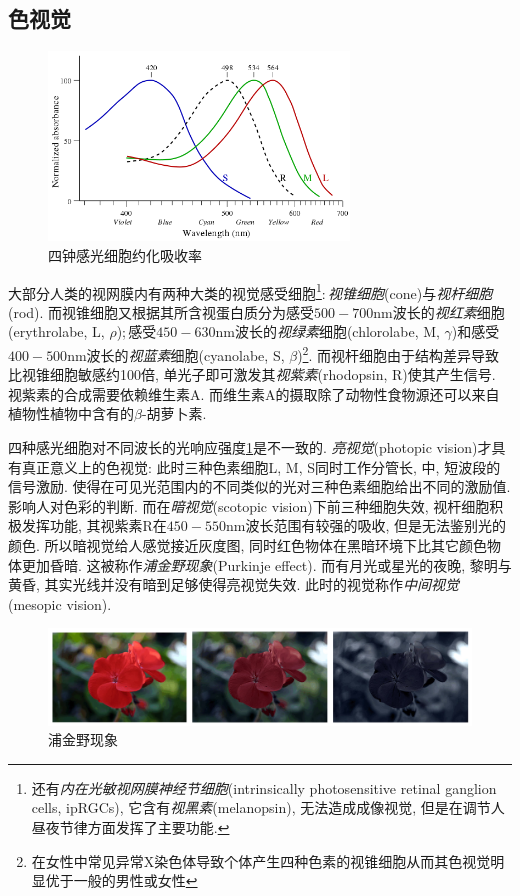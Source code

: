 \subsection{色视觉}
\begin{figure}
\vspace{-0.4cm}
\centering
\includegraphics[width=8cm]{image/5-8-1.png}
\caption{四钟感光细胞约化吸收率}\label{fig:phtsens}
\end{figure}
大部分人类的视网膜内有两种大类的视觉感受细胞\footnote{还有\emph{内在光敏视网膜神经节细胞}(intrinsically photosensitive retinal ganglion cells, ipRGCs), 它含有\emph{视黑素}(melanopsin), 无法造成成像视觉, 但是在调节人昼夜节律方面发挥了主要功能.}:\,\emph{视锥细胞}(cone)与\emph{视杆细胞}(rod). 而视锥细胞又根据其所含视蛋白质分为感受$500-700\mathrm{nm}$波长的\emph{视红素}细胞(erythrolabe, L, $\rho$);\,感受$450-630\mathrm{nm}$波长的\emph{视绿素}细胞(chlorolabe, M, $\gamma$)和感受$400-500\mathrm{nm}$波长的\emph{视蓝素}细胞(cyanolabe, S, $\beta$)\footnote{在女性中常见异常X染色体导致个体产生四种色素的视锥细胞从而其色视觉明显优于一般的男性或女性}. 而视杆细胞由于结构差异导致比视锥细胞敏感约100倍, 单光子即可激发其\emph{视紫素}(rhodopsin, R)使其产生信号. 视紫素的合成需要依赖维生素A. 而维生素A的摄取除了动物性食物源还可以来自植物性植物中含有的$\beta$-胡萝卜素.

四种感光细胞对不同波长的光响应强度\ref{fig:phtsens}是不一致的. \emph{亮视觉}(photopic vision)才具有真正意义上的色视觉: 此时三种色素细胞L, M, S同时工作分管长, 中, 短波段的信号激励. 使得在可见光范围内的不同类似的光对三种色素细胞给出不同的激励值. 影响人对色彩的判断. 而在\emph{暗视觉}(scotopic vision)下前三种细胞失效, 视杆细胞积极发挥功能, 其视紫素R在$450-550\mathrm{nm}$波长范围有较强的吸收, 但是无法鉴别光的颜色. 所以暗视觉给人感觉接近灰度图, 同时红色物体在黑暗环境下比其它颜色物体更加昏暗. 这被称作\emph{浦金野现象}(Purkinje effect). 而有月光或星光的夜晚, 黎明与黄昏, 其实光线并没有暗到足够使得亮视觉失效. 此时的视觉称作\emph{中间视觉}(mesopic vision).

\begin{figure}[H]
\centering
\includegraphics[width=16cm]{image/5-8-2.png}
\caption{浦金野现象}
\end{figure}


